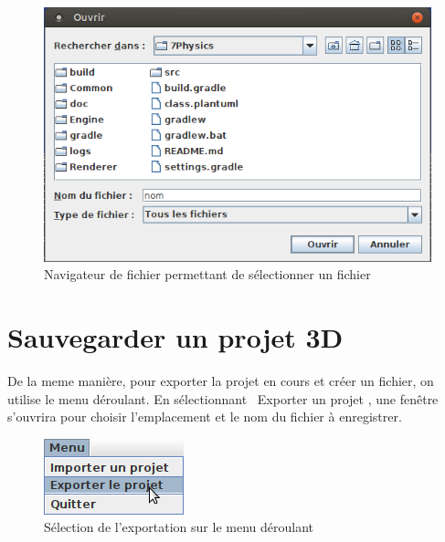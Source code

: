 \documentclass[11pt]{report}
\begin{document}
\begin{figure}[h]
  \centering
  \includegraphics[width=15cm]{./nav_fichier.png}
  \caption{Navigateur de fichier permettant de sélectionner un fichier}
\end{figure}


\section{Sauvegarder un projet 3D}

De la meme manière, pour exporter la projet en cours et créer un fichier, on utilise le menu déroulant. 
En sélectionnant \flqq\ Exporter un projet \frqq, une fenêtre s'ouvrira pour choisir l'emplacement et le nom du fichier à enregistrer.

\begin{figure}[h]
  \centering
  \includegraphics{./menu_exp.png}
  \caption{Sélection de l'exportation sur le menu déroulant}
\end{figure}
\end{document}
